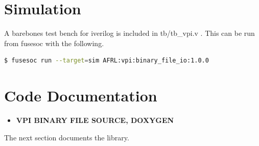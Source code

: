 \newpage

\section{Simulation}
\par
A barebones test bench for iverilog is included in tb/tb\_vpi.v . This can be run from fusesoc with the following.
\begin{lstlisting}[language=bash]
$ fusesoc run --target=sim AFRL:vpi:binary_file_io:1.0.0
\end{lstlisting}

\newpage

\section{Code Documentation} \label{Module Documentation}

\begin{itemize}
\item \textbf{VPI BINARY FILE SOURCE, DOXYGEN}
\end{itemize}
The next section documents the library.

